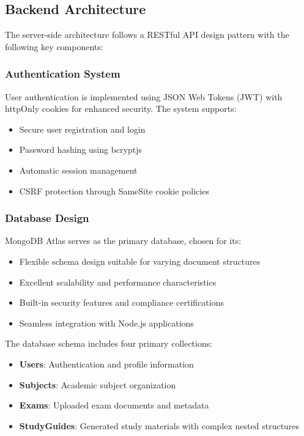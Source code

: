 \documentclass[conference]{IEEEtran}
\begin{document}
\subsection{Backend Architecture}

The server-side architecture follows a RESTful API design pattern with the following key components:

\subsubsection{Authentication System}
User authentication is implemented using JSON Web Tokens (JWT) with httpOnly cookies for enhanced security. The system supports:
\begin{itemize}
\item Secure user registration and login
\item Password hashing using bcryptjs
\item Automatic session management
\item CSRF protection through SameSite cookie policies
\end{itemize}

\subsubsection{Database Design}
MongoDB Atlas serves as the primary database, chosen for its:
\begin{itemize}
\item Flexible schema design suitable for varying document structures
\item Excellent scalability and performance characteristics
\item Built-in security features and compliance certifications
\item Seamless integration with Node.js applications
\end{itemize}

The database schema includes four primary collections:
\begin{itemize}
\item \textbf{Users}: Authentication and profile information
\item \textbf{Subjects}: Academic subject organization
\item \textbf{Exams}: Uploaded exam documents and metadata
\item \textbf{StudyGuides}: Generated study materials with complex nested structures
\end{itemize}
\end{document}
